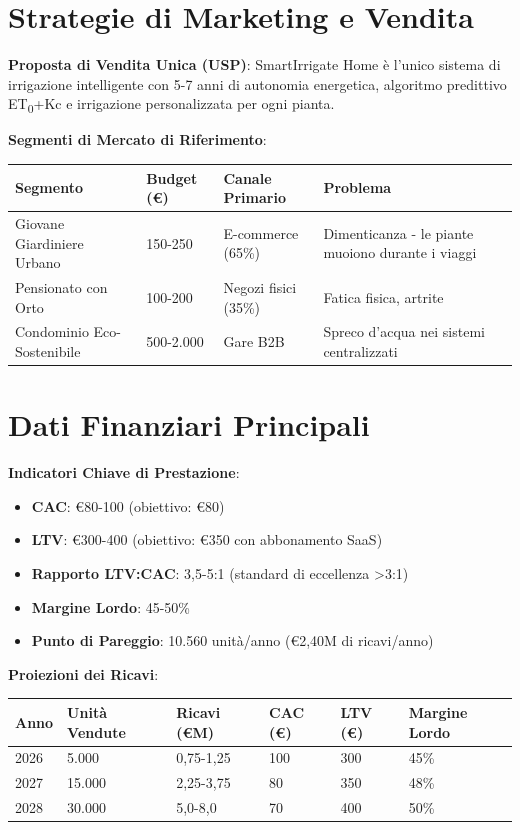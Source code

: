 \documentclass[11pt,a4paper]{report}
\begin{document}
\section{Strategie di Marketing e Vendita}
\textbf{Proposta di Vendita Unica (USP)}: SmartIrrigate Home è l'unico sistema di irrigazione intelligente con 5-7 anni di autonomia energetica, algoritmo predittivo ET\textsubscript{0}+Kc e irrigazione personalizzata per ogni pianta.

\textbf{Segmenti di Mercato di Riferimento}:

\begin{longtable}{|p{3cm}|p{2.5cm}|p{3cm}|p{4cm}|}
\hline
\textbf{Segmento} & \textbf{Budget (€)} & \textbf{Canale Primario} & \textbf{Problema} \\ \hline
Giovane Giardiniere Urbano & 150-250 & E-commerce (65\%) & Dimenticanza - le piante muoiono durante i viaggi \\ \hline
Pensionato con Orto & 100-200 & Negozi fisici (35\%) & Fatica fisica, artrite \\ \hline
Condominio Eco-Sostenibile & 500-2.000 & Gare B2B & Spreco d'acqua nei sistemi centralizzati \\ \hline
\end{longtable}

\section{Dati Finanziari Principali}
\textbf{Indicatori Chiave di Prestazione}:
\begin{itemize}
    \item \textbf{CAC}: €80-100 (obiettivo: €80)
    \item \textbf{LTV}: €300-400 (obiettivo: €350 con abbonamento SaaS)
    \item \textbf{Rapporto LTV:CAC}: 3,5-5:1 (standard di eccellenza >3:1)
    \item \textbf{Margine Lordo}: 45-50\%
    \item \textbf{Punto di Pareggio}: 10.560 unità/anno (€2,40M di ricavi/anno)
\end{itemize}

\textbf{Proiezioni dei Ricavi}:

\begin{longtable}{|p{1.5cm}|p{2cm}|p{2cm}|p{1.5cm}|p{1.5cm}|p{2cm}|}
\hline
\textbf{Anno} & \textbf{Unità Vendute} & \textbf{Ricavi (€M)} & \textbf{CAC (€)} & \textbf{LTV (€)} & \textbf{Margine Lordo} \\ \hline
2026 & 5.000 & 0,75-1,25 & 100 & 300 & 45\% \\ \hline
2027 & 15.000 & 2,25-3,75 & 80 & 350 & 48\% \\ \hline
2028 & 30.000 & 5,0-8,0 & 70 & 400 & 50\% \\ \hline
\end{longtable}
\end{document}
